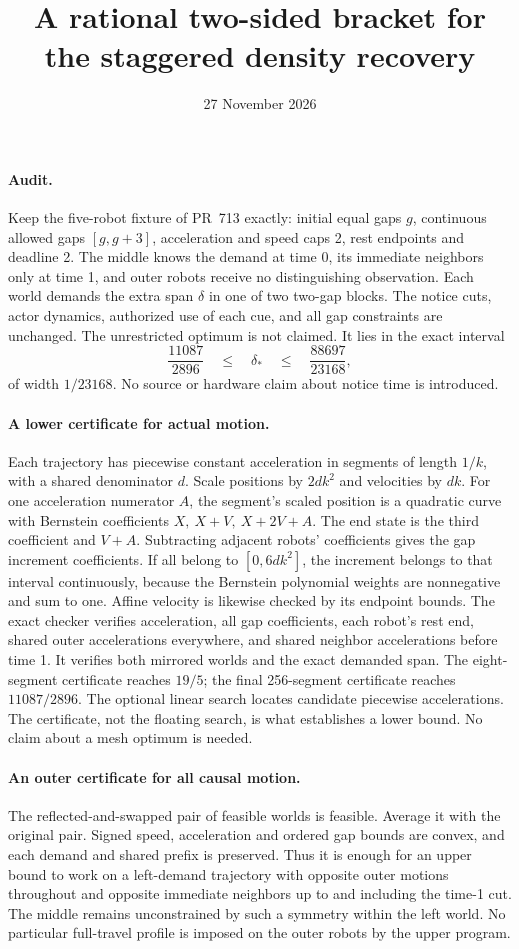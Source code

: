\documentclass[11pt]{article}
\title{A rational two-sided bracket for the staggered density recovery}
\date{27 November 2026}
\begin{document}
\maketitle
\paragraph{Audit.}
Keep the five-robot fixture of PR~713 exactly: initial equal
gaps \(g\), continuous allowed gaps \([g,g+3]\), acceleration and
speed caps 2, rest endpoints and deadline 2. The middle knows the
demand at time 0, its immediate neighbors only at time 1, and
outer robots receive no distinguishing observation. Each world
demands the extra span \(\delta\) in one of two two-gap blocks.
The notice cuts, actor dynamics, authorized use of each cue,
and all gap constraints are unchanged. The unrestricted optimum
is not claimed. It lies in the exact interval
\[
        \frac{11087}{2896}\quad\le\quad \delta_*
        \quad\le\quad \frac{88697}{23168},
\]
of width \(1/23168\). No source or hardware claim about notice time
is introduced.

\paragraph{A lower certificate for actual motion.}
Each trajectory has piecewise constant acceleration in segments
of length \(1/k\), with a shared denominator \(d\).
Scale positions by \(2dk^2\) and velocities by \(dk\).
For one acceleration numerator \(A\), the segment's scaled
position is a quadratic curve with Bernstein coefficients
\(X,\ X+V,\ X+2V+A\). The end state is the third coefficient and
\(V+A\). Subtracting adjacent robots' coefficients gives the
gap increment coefficients. If all belong to \([0,6dk^2]\),
the increment belongs to that interval continuously, because
the Bernstein polynomial weights are nonnegative and sum
to one. Affine velocity is likewise checked by its endpoint
bounds. The exact checker verifies acceleration, all gap
coefficients, each robot's rest end, shared outer accelerations
everywhere, and shared neighbor accelerations before time 1.
It verifies both mirrored worlds and the exact demanded span.
The eight-segment certificate reaches \(19/5\); the final
256-segment certificate reaches \(11087/2896\). The optional
linear search locates candidate piecewise accelerations.
The certificate, not the floating search, is what establishes
a lower bound. No claim about a mesh optimum is needed.

\paragraph{An outer certificate for all causal motion.}
The reflected-and-swapped pair of feasible worlds is feasible.
Average it with the original pair. Signed speed, acceleration
and ordered gap bounds are convex, and each demand and shared
prefix is preserved. Thus it is enough for an upper bound
to work on a left-demand trajectory with opposite outer
motions throughout and opposite immediate neighbors up to
and including the time-1 cut. The middle remains unconstrained
by such a symmetry within the left world. No particular
full-travel profile is imposed on the outer robots by the
upper program.
\end{document}
